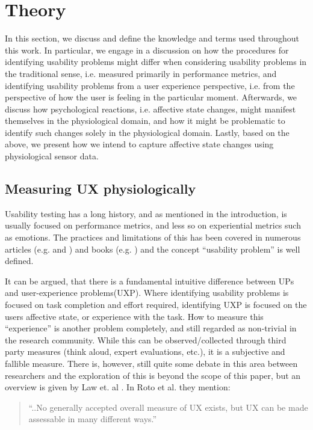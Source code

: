 \section{Theory}
In this section, we discuss and define the knowledge and terms used throughout this work. In particular, we engage in a
discussion on how the procedures for identifying usability problems might differ when considering usability problems in
the traditional sense, i.e. measured primarily in performance metrics, and identifying usability problems from a user
experience perspective, i.e. from the perspective of how the user is feeling in the particular moment. Afterwards, we
discuss how psychological reactions, i.e. affective state changes, might manifest themselves in the
physiological domain, and how it might be problematic to identify such changes solely in the physiological
domain. Lastly, based on the above, we present how we intend to capture affective state changes using physiological
sensor data.

\subsection{Measuring UX physiologically}
Usability testing has a long history, and as mentioned in the introduction, is usually focused on performance metrics,
and less so on experiential metrics such as emotions.  The practices and limitations of this has been covered in
numerous articles (e.g. \cite{usability_eval} and \cite{eval_effect}) and books (e.g. \cite{guide_to_upeval}) and the
concept ``usability problem'' is well defined.

It can be argued, that there is a fundamental intuitive difference between UPs and user-experience problems(UXP).  Where
identifying usability problems is focused on task completion and effort required, identifying UXP is focused on the
users affective state, or experience with the task.  How to measure this ``experience'' is another problem completely,
and still regarded as non-trivial in the research community. While this can be observed/collected through third party
measures (think aloud, expert evaluations, etc.), it is a subjective and fallible measure.  There is, however, still
quite some debate in this area between researchers and the exploration of this is beyond the scope of this paper, but an
overview is given by Law et. al \cite{attitudes_ux_measure}.  In Roto et al. \cite{what_is_ux} they mention:

\begin{quotation}
  ``..No generally accepted overall measure of UX exists, but UX can be made assessable in many different ways.''
\end{quotation}


